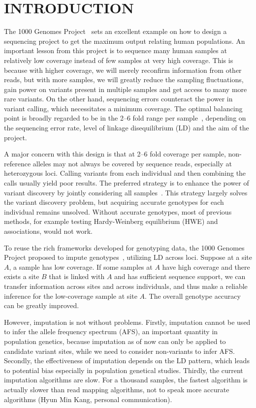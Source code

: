 \documentclass{bioinfo}
\begin{document}
\section{INTRODUCTION}

The 1000 Genomes Project~\citep{1000-Genomes-Project-Consortium:2010qc} sets an
excellent example on how to design a sequencing project to get the maximum
output relating human populations. An important lesson from this project is to
sequence many human samples at relatively low coverage instead of few samples
at very high coverage. This is because with higher coverage, we will merely
reconfirm information from other reads, but with more samples, we will greatly
reduce the sampling fluctuations, gain power on variants present in multiple
samples and get access to many more rare variants. On the other hand,
sequencing errors counteract the power in variant calling, which necessitates a
minimum coverage.  The optimal balancing point is broadly regarded to be in the
2--6 fold range per sample~\citep{Le:2010uq,Li:2011fk}, depending on the
sequencing error rate, level of linkage disequilibrium (LD) and the aim of the
project.

A major concern with this design is that at 2--6 fold coverage per sample,
non-reference alleles may not always be covered by sequence reads, especially
at heterozygous loci. Calling variants from each individual and then combining
the calls usually yield poor results.  The preferred strategy is to enhance the
power of variant discovery by jointly considering all
samples~\citep{Le:2010uq,Li:2011fk,Depristo:2011vn,Nielsen:2011fk}. This
strategy largely solves the variant discovery problem, but acquiring accurate
genotypes for each individual remains unsolved. Without accurate genotypes,
most of previous methods, for example testing Hardy-Weinberg equilibrium (HWE)
and associations, would not work.

To reuse the rich frameworks developed for genotyping data, the 1000 Genomes
Project proposed to impute
genotypes~\citep{Li:2009gb,Browning:2009jl,Howie:2009mb,Li:2010ky}, utilizing
LD across loci.  Suppose at a site $A$, a sample has low coverage.  If some
samples at $A$ have high coverage and there exists a site $B$ that is linked
with $A$ and has sufficient sequence support, we can transfer information
across sites and across individuals, and thus make a reliable inference for the
low-coverage sample at site $A$. The overall genotype accuracy can be greatly
improved.

However, imputation is not without problems. Firstly, imputation cannot be used
to infer the allele frequency spectrum (AFS), an important quantity in
population genetics, because imputation as of now can only be applied to
candidate variant sites, while we need to consider non-variants to infer AFS.
Secondly, the effectiveness of imputation depends on the LD pattern, which
leads to potential bias especially in population genetical studies. Thirdly,
the current imputation algorithms are slow. For a thousand samples, the fastest
algorithm is actually slower than read mapping algorithms, not to speak more
accurate algorithms (Hyun Min Kang, personal communication).
\end{document}
